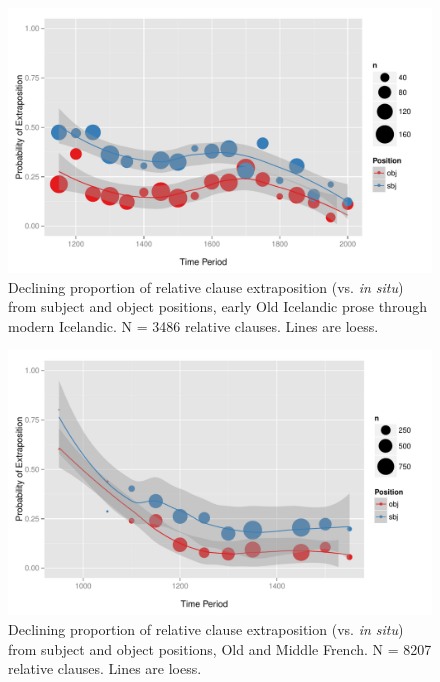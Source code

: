 \begin{figure}

  \includegraphics[width=1.1\textwidth]{stableVarTalks/exSbjObjYearBinned50Loessice.pdf}
\caption{Declining proportion of relative clause extraposition (vs. \textsl{in situ}) from subject and object positions, early Old Icelandic prose through modern Icelandic. N = 3486 relative clauses. Lines are loess.}
\label{icefig}       
\end{figure}

\begin{figure}
  \includegraphics[width=1.1\textwidth]{stableVarTalks/exSbjObjYearBinned50Loessfre.pdf}
\caption{Declining proportion of relative clause extraposition (vs. \textsl{in situ}) from subject and object positions, Old and Middle French. N = 8207 relative clauses. Lines are loess.}
\label{frefig}       
\end{figure}

